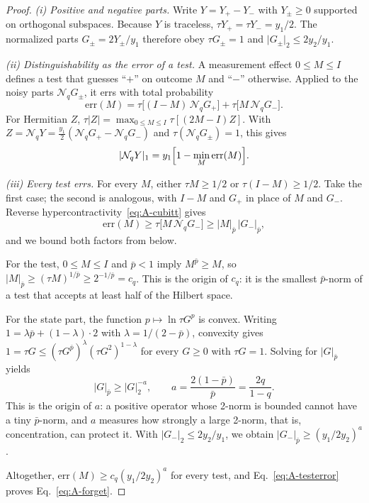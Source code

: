 \documentclass[aps,pra,reprint,superscriptaddress,floatfix]{revtex4-2}
\theoremstyle{plain}
\newcommand{\nrm}[2]{\lvert #1\rvert_{#2}}
\newcommand{\Nq}{\mathcal N_q}
\begin{document}
\begin{proof}
\emph{(i) Positive and negative parts.} Write $Y=Y_+-Y_-$ with $Y_\pm\ge0$ supported on orthogonal subspaces. Because $Y$ is traceless, $\tau Y_+=\tau Y_-=y_1/2$. The normalized parts $G_\pm=2Y_\pm/y_1$ therefore obey $\tau G_\pm=1$ and $\nrm{G_\pm}2\le2y_2/y_1$.

\emph{(ii) Distinguishability as the error of a test.} A measurement effect $0\le M\le I$ defines a test that guesses ``$+$'' on outcome $M$ and ``$-$'' otherwise. Applied to the noisy parts $\Nq G_\pm$, it errs with total probability
\begin{equation}
\mathrm{err}(M)=\tau\bigl[(I-M)\,\Nq G_+\bigr]+\tau\bigl[M\,\Nq G_-\bigr].
\end{equation}
For Hermitian $Z$, $\tau|Z|=\max_{0\le M\le I}\tau[(2M-I)Z]$. With $Z=\Nq Y=\frac{y_1}2(\Nq G_+-\Nq G_-)$ and $\tau(\Nq G_\pm)=1$, this gives
\begin{equation}
\nrm{\Nq Y}1=y_1\Bigl[1-\min_M\mathrm{err}(M)\Bigr].
\label{eq:A-testerror}
\end{equation}

\emph{(iii) Every test errs.} For every $M$, either $\tau M\ge1/2$ or $\tau(I-M)\ge1/2$. Take the first case; the second is analogous, with $I-M$ and $G_+$ in place of $M$ and $G_-$. Reverse hypercontractivity~\eqref{eq:A-cubitt} gives
\begin{equation}
\mathrm{err}(M)\ge\tau\bigl[M\,\Nq G_-\bigr]\ge\nrm M{\bar p}\,\nrm{G_-}{\bar p},
\end{equation}
and we bound both factors from below.

For the test, $0\le M\le I$ and $\bar p<1$ imply $M^{\bar p}\ge M$, so $\nrm M{\bar p}\ge(\tau M)^{1/\bar p}\ge2^{-1/\bar p}=c_q$. This is the origin of $c_q$: it is the smallest $\bar p$-norm of a test that accepts at least half of the Hilbert space.

For the state part, the function $p\mapsto\ln\tau G^p$ is convex. Writing $1=\lambda\bar p+(1-\lambda)\cdot2$ with $\lambda=1/(2-\bar p)$, convexity gives $1=\tau G\le(\tau G^{\bar p})^{\lambda}(\tau G^2)^{1-\lambda}$ for every $G\ge0$ with $\tau G=1$. Solving for $\nrm G{\bar p}$ yields
\begin{equation}
\nrm G{\bar p}\ge\nrm G2^{-a},\qquad a=\frac{2(1-\bar p)}{\bar p}=\frac{2q}{1-q}.
\end{equation}
This is the origin of $a$: a positive operator whose 2-norm is bounded cannot have a tiny $\bar p$-norm, and $a$ measures how strongly a large 2-norm, that is, concentration, can protect it. With $\nrm{G_-}2\le2y_2/y_1$, we obtain $\nrm{G_-}{\bar p}\ge(y_1/2y_2)^a$.

Altogether, $\mathrm{err}(M)\ge c_q(y_1/2y_2)^a$ for every test, and Eq.~\eqref{eq:A-testerror} proves Eq.~\eqref{eq:A-forget}.
\end{proof}
\end{document}
